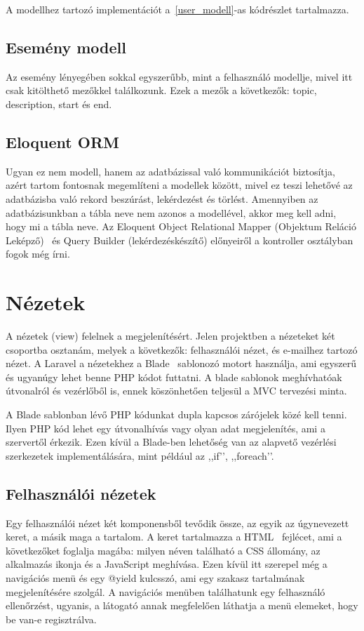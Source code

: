 \documentclass[
]{thesis-ekf}
\theoremstyle{definition}
\theoremstyle{remark}
\begin{document}
	A modellhez tartozó implementációt a~\ref{user_modell}-as kódrészlet tartalmazza.
	
	
	
	\subsection{Esemény modell}
	Az esemény lényegében sokkal egyszerűbb, mint a felhasználó modellje, mivel itt csak kitölthető mezőkkel találkozunk. Ezek a mezők a következők: topic, description, start és end.
	
	\subsection{Eloquent ORM}
	Ugyan ez nem modell, hanem az adatbázissal való kommunikációt biztosítja, azért tartom fontosnak megemlíteni a modellek között, mivel ez teszi lehetővé az adatbázisba való rekord beszúrást, lekérdezést és törlést. Amennyiben az adatbázisunkban a tábla neve nem azonos a modellével, akkor meg kell adni, hogy mi a tábla neve. Az Eloquent Object Relational Mapper (Objektum Reláció Leképző)~\cite{laravel_eloquent} és Query Builder (lekérdezéskészítő) előnyeiről a kontroller osztályban fogok még írni.
	
	\section{Nézetek}
	A nézetek (view) felelnek a megjelenítésért. Jelen projektben a nézeteket két csoportba osztanám, melyek a következők: felhasználói nézet, és e-mailhez tartozó nézet. A Laravel a nézetekhez a Blade~\cite{laravel_blade} sablonozó motort használja, ami egyszerű és ugyanúgy lehet benne PHP kódot futtatni. A blade sablonok meghívhatóak útvonalról és vezérlőből is, ennek köszönhetően teljesül a MVC tervezési minta. 
	
	A Blade sablonban lévő PHP kódunkat dupla kapcsos zárójelek közé kell tenni. Ilyen PHP kód lehet egy útvonalhívás vagy olyan adat megjelenítés, ami a szervertől érkezik. Ezen kívül a Blade-ben lehetőség van az alapvető vezérlési szerkezetek implementálására, mint például az ,,if’’, ,,foreach’’.
	
	\subsection{Felhasználói nézetek}
	Egy felhasználói nézet két komponensből tevődik össze, az egyik az úgynevezett keret, a másik maga a tartalom. A keret tartalmazza a HTML~\cite{html_doc} fejlécet, ami a következőket foglalja magába: milyen néven található a CSS állomány, az alkalmazás ikonja és a JavaScript meghívása. Ezen kívül itt szerepel még a navigációs menü és egy @yield kulcsszó, ami egy szakasz tartalmának megjelenítésére szolgál. A navigációs menüben találhatunk egy felhasználó ellenőrzést, ugyanis, a látogató annak megfelelően láthatja a menü elemeket, hogy be van-e regisztrálva.
	
\end{document}
